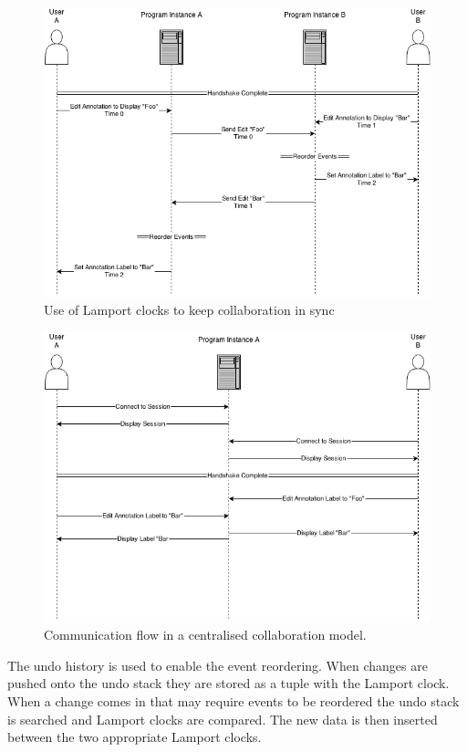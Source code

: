 \begin{figure}[h!]
    \centering
    \includegraphics[width=\textwidth]{images/minf_collab_mixup_fix.png}
    \caption{Use of Lamport clocks to keep collaboration in sync}
    \label{fig:collab_mixup_fix}
\end{figure}

\begin{figure}[h!]
    \centering
    \includegraphics[width=\textwidth]{images/collaboration_single_instance.png}
    \caption{Communication flow in a centralised collaboration model.}
    \label{fig:collab_mixup_fix_2}
\end{figure}

The undo history is used to enable the event reordering.  When changes are pushed onto the undo stack they are stored as a tuple with the Lamport clock.  When a change comes in that may require events to be reordered the undo stack is searched and Lamport clocks are compared.  The new data is then inserted between the two appropriate Lamport clocks.

